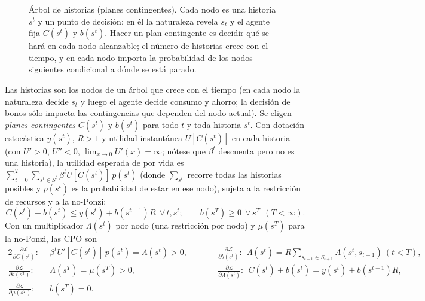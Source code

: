 \documentclass[11pt]{article}
\theoremstyle{definition}
\begin{document}
\begin{figure}[h]
\centering
{}
\caption{Árbol de historias (planes contingentes). Cada nodo es una historia $s^{t}$ y un punto de
decisión: en él la naturaleza revela $s_{t}$ y el agente fija $C(s^{t})$ y $b(s^{t})$. Hacer un plan
contingente es decidir qué se hará en cada nodo alcanzable; el número de historias crece con el tiempo,
y en cada nodo importa la probabilidad de los nodos siguientes condicional a dónde se está parado.}
\end{figure}
Las historias son los nodos de un árbol que crece con el tiempo (en cada nodo la naturaleza decide
$s_{t}$ y luego el agente decide consumo y ahorro; la decisión de bonos sólo impacta las contingencias
que dependen del nodo actual). Se eligen \emph{planes contingentes} $C(s^{t})$ y $b(s^{t})$ para todo
$t$ y toda historia $s^{t}$. Con dotación estocástica $y(s^{t})$, $R>1$ y utilidad instantánea
$U[C(s^{t})]$ en cada historia (con $U'>0$, $U''<0$, $\lim_{x\to0}U'(x)=\infty$; nótese que $\beta^{t}$
descuenta pero no es una historia), la utilidad esperada de por vida es
$\sum_{t=0}^{T}\sum_{s^{t}\in S^{t}}\beta^{t}U[C(s^{t})]\,p(s^{t})$ (donde $\sum_{s^{t}}$ recorre todas
las historias posibles y $p(s^{t})$ es la probabilidad de estar en ese nodo), sujeta a la restricción
de recursos y a la no-Ponzi:
\begin{equation}
C(s^{t})+b(s^{t})\le y(s^{t})+b(s^{t-1})R\ \ \forall\,t,s^{t};
\qquad
b(s^{T})\ge0\ \ \forall\,s^{T}\ \ (T<\infty).
\end{equation}
Con un multiplicador $\Lambda(s^{t})$ por nodo (una restricción por nodo) y $\mu(s^{T})$ para la
no-Ponzi, las CPO son
\begin{alignat}{2}
\tfrac{\partial\mathcal{L}}{\partial C(s^{t})}:&\ \ \beta^{t}U'[C(s^{t})]\,p(s^{t})=\Lambda(s^{t})>0, &\qquad&
\tfrac{\partial\mathcal{L}}{\partial b(s^{t})}:\ \ \Lambda(s^{t})=R\!\!\sum_{s_{t+1}\in S_{t+1}}\!\!\Lambda(s^{t},s_{t+1})\ (t<T),\\
\tfrac{\partial\mathcal{L}}{\partial b(s^{T})}:&\ \ \Lambda(s^{T})=\mu(s^{T})>0, &&
\tfrac{\partial\mathcal{L}}{\partial \Lambda(s^{t})}:\ \ C(s^{t})+b(s^{t})=y(s^{t})+b(s^{t-1})R,\\
\tfrac{\partial\mathcal{L}}{\partial \mu(s^{T})}:&\ \ b(s^{T})=0. &&
\end{alignat}
\end{document}
